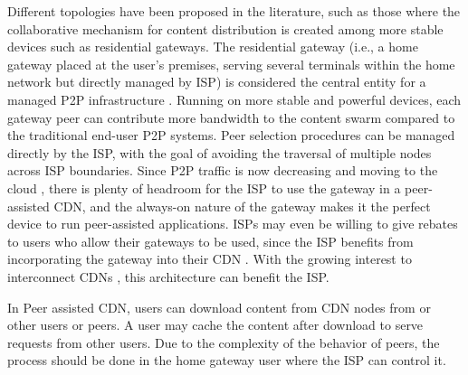 \documentclass[10pt,final,journal,a4paper]{IEEEtran}
\begin{document}
Different topologies have been proposed in the literature, such as those where the collaborative mechanism for content distribution is
created among more stable devices such as residential gateways.  
The residential gateway (i.e., a home gateway placed at the user's premises, serving several terminals within the home network but directly managed by ISP) is considered the central entity for a managed P2P infrastructure \cite{Misra:2010:IPS:1811099.1811064,Cha:2008:NTP:1855641.1855646}.
Running on more stable and powerful devices, each gateway peer can contribute more bandwidth to the content swarm compared to the traditional end-user P2P systems.  Peer selection procedures can be managed directly by the ISP, with the goal of avoiding the traversal of multiple nodes across ISP boundaries.  
Since P2P traffic is now decreasing and moving to the cloud \cite{Labovitz:2010:IIT:2043164.1851194}, there is plenty of headroom for the ISP to use the gateway in a peer-assisted CDN, and the always-on nature of the gateway makes it the perfect device to run peer-assisted applications.  
ISPs may even be willing to give rebates to users who allow their gateways to be used, since the ISP benefits from incorporating the gateway into their CDN \cite{Mori:2009:IDP:1811681.1811725}.  
With the growing interest to interconnect CDNs \cite{cdni,oceanproject}, this architecture can benefit the ISP.

In Peer assisted CDN, users can download content from CDN nodes from or other users or peers. 
A user may cache the content after download to serve requests from other users. 
Due to the complexity of the behavior of peers, the process should be done in the home gateway user where the ISP can control it.

\end{document}
